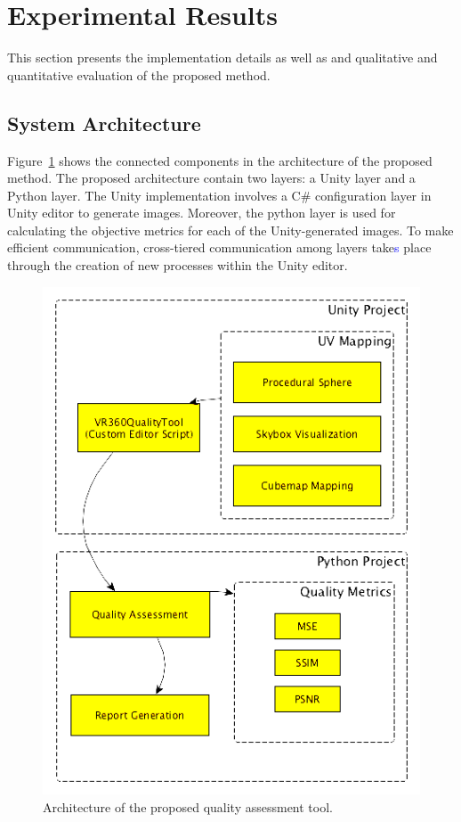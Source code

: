 \documentclass[10pt,conference,pdftex]{IEEEtran}
\begin{document}
\section{Experimental Results} \label{sec:experiments}
This section presents the implementation details as well as and qualitative and quantitative evaluation of the proposed method.

\subsection{System Architecture}

Figure~\ref{fig:fig_architecture} shows the connected components in the architecture of the proposed method. The proposed architecture contain two layers: a Unity layer and a Python layer. The Unity implementation involves a C$\#$ configuration layer in Unity editor to generate images. Moreover, the python layer is used for calculating the objective metrics for each of the Unity-generated images. To make efficient communication, cross-tiered communication among layers take\textcolor{blue}{s} place through the creation of new processes within the Unity editor.

\begin{figure}[ht!]
    \centering
        \includegraphics[width=0.9\linewidth]{tool_arch_en_edit.png}%
    \caption{Architecture of the proposed quality assessment tool.}
    \label{fig:fig_architecture}
\end{figure}
\end{document}
